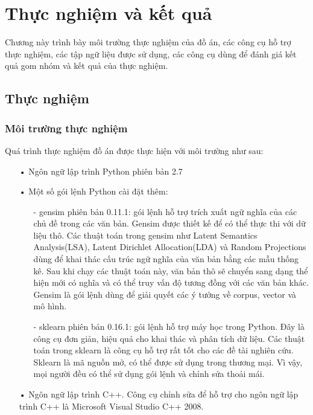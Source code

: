 \chapter{Thực nghiệm và kết quả}
\label{Chapter4}
Chương này trình bày môi trường thực nghiệm của đồ án, các công cụ hỗ trợ thực nghiệm, các tập ngữ liệu được sử dụng, các công cụ dùng để đánh giá kết quả gom nhóm và kết quả của thực nghiệm.

\section{Thực nghiệm}
\subsection{Môi trường thực nghiệm}
Quá trình thực nghiệm đồ án được thực hiện với môi trường như sau:
\begin{enumerate}
\item[•]Ngôn ngữ lập trình Python phiên bản 2.7
\item[•]Một số gói lệnh Python cài đặt thêm:
\begin{enumerate}
\item[-] gensim phiên bản 0.11.1: gói lệnh hỗ trợ trích xuất ngữ nghĩa của các chủ đề trong các văn bản.
Gensim được thiết kế để có thể thực thi với dữ liệu thô.
Các thuật toán trong gensim như Latent Semantics Analysis(LSA), Latent Dirichlet Allocation(LDA) và Random Projections dùng để khai thác cấu trúc ngữ nghĩa của văn bản bằng các mẫu thống kê.
Sau khi chạy các thuật toán này, văn bản thô sẽ chuyển sang dạng thể hiện mới có nghĩa và có thể truy vấn độ tương đồng với các văn bản khác.
Gensim là gói lệnh dùng để giải quyết các ý tưởng về corpus, vector và mô hình.
\item[-] sklearn phiên bản 0.16.1: gói lệnh hỗ trợ máy học trong Python.
Đây là công cụ đơn giản, hiệu quả cho khai thác và phân tích dữ liệu.
Các thuật toán trong sklearn là công cụ hỗ trợ rất tốt cho các đề tài nghiên cứu.
Sklearn là mã nguồn mở, có thể được sử dụng trong thương mại.
Vì vậy, mọi người đều có thể sử dụng gói lệnh và chỉnh sửa thoải mái.
\end{enumerate}
\item[•]Ngôn ngữ lập trình C++.
Công cụ chỉnh sửa để hỗ trợ cho ngôn ngữ lập trình C++ là Microsoft Visual Studio C++ 2008.
\end{enumerate}

